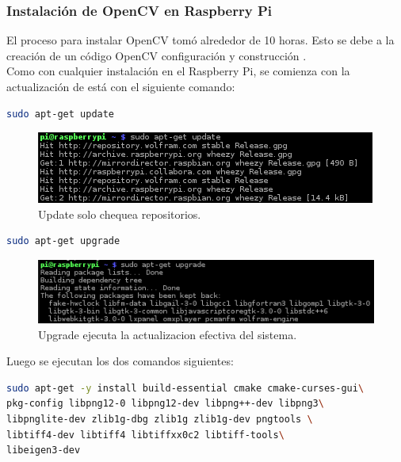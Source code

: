 \documentclass[letterpaper,12pt]{article}
\begin{document}
\subsubsection{Instalación de OpenCV en Raspberry Pi}

El proceso para instalar OpenCV tomó alrededor de 10 horas. Esto se debe a la creación de un código OpenCV configuración y construcción \cite{RoboPapa}.\\
Como con cualquier instalación en el Raspberry Pi, se comienza con la actualización de está con el siguiente comando:\\

\begin{lstlisting}[language=bash, frame=single]
sudo apt-get update
\end{lstlisting}
\begin{figure}[H]
\centering
\includegraphics[scale=0.6,keepaspectratio=true]{Figs/Raspy1.png}
\caption{Update solo chequea repositorios. }
\label{fig:Raspy1}
\end{figure}

\begin{lstlisting}[language=bash, frame=single]
sudo apt-get upgrade
\end{lstlisting}

\begin{figure}[H]
\centering
\includegraphics[scale=0.6,keepaspectratio=true]{Figs/Raspy2.png}
\caption{Upgrade ejecuta la actualizacion efectiva del sistema.}
\label{fig:Raspy2}
\end{figure}

Luego se ejecutan los dos comandos siguientes:
\begin{lstlisting}[language=bash, frame=single]
sudo apt-get -y install build-essential cmake cmake-curses-gui\
pkg-config libpng12-0 libpng12-dev libpng++-dev libpng3\
libpnglite-dev zlib1g-dbg zlib1g zlib1g-dev pngtools \
libtiff4-dev libtiff4 libtiffxx0c2 libtiff-tools\
libeigen3-dev
\end{lstlisting}
\end{document}
